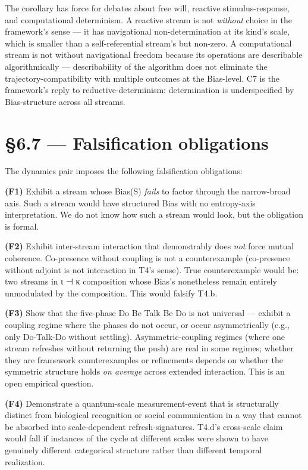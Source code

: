\documentclass[11pt, openany]{book}
\newcommand{\sectionbreak}{\clearpage}
\begin{document}
The corollary has force for debates about free will, reactive stimulus-response, and computational determinism. A reactive stream is not \textit{without} choice in the framework's sense --- it has navigational non-determination at its kind's scale, which is smaller than a self-referential stream's but non-zero. A computational stream is not without navigational freedom because its operations are describable algorithmically --- describability of the algorithm does not eliminate the trajectory-compatibility with multiple outcomes at the Bias-level. C7 is the framework's reply to reductive-determinism: determination is underspecified by Bias-structure across all streams.

\sectionbreak

\section{§6.7 --- Falsification obligations}

The dynamics pair imposes the following falsification obligations:

\textbf{(F1)} Exhibit a stream whose Bias(S) \textit{fails} to factor through the narrow-broad axis. Such a stream would have structured Bias with no entropy-axis interpretation. We do not know how such a stream would look, but the obligation is formal.

\textbf{(F2)} Exhibit inter-stream interaction that demonstrably does \textit{not} force mutual coherence. Co-presence without coupling is not a counterexample (co-presence without adjoint is not interaction in T4's sense). True counterexample would be: two streams in ι ⊣ κ composition whose Bias's nonetheless remain entirely unmodulated by the composition. This would falsify T4.b.

\textbf{(F3)} Show that the five-phase Do Be Talk Be Do is not universal --- exhibit a coupling regime where the phases do not occur, or occur asymmetrically (e.g., only Do-Talk-Do without settling). Asymmetric-coupling regimes (where one stream refreshes without returning the push) are real in some regimes; whether they are framework counterexamples or refinements depends on whether the symmetric structure holds \textit{on average} across extended interaction. This is an open empirical question.

\textbf{(F4)} Demonstrate a quantum-scale measurement-event that is structurally distinct from biological recognition or social communication in a way that cannot be absorbed into scale-dependent refresh-signatures. T4.d's cross-scale claim would fall if instances of the cycle at different scales were shown to have genuinely different categorical structure rather than different temporal realization.
\end{document}

